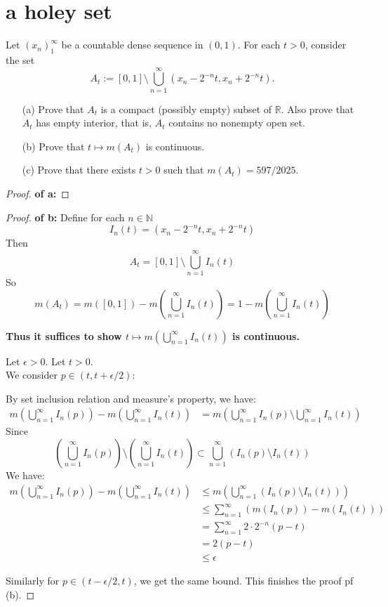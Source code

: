 \documentclass[lang=cn,11pt]{elegantbook}
\begin{document}
\section{a holey set}
  Let $(x_n)_1^\infty$ be a countable dense sequence in $(0,1)$. For each $t>0$, consider the set
  \[
    A_t:=[0,1]\setminus\bigcup_{n=1}^\infty(x_n-2^{-n}t,x_n+2^{-n}t).
  \]
  \begin{itemize}
  \item[(a)]
  Prove that $A_t$ is a compact (possibly empty) subset of $\mathbb{R}$. Also prove that $A_t$ has empty interior, that is, $A_t$ contains no nonempty open set.
\item[(b)]
  Prove that $t\mapsto m(A_t)$ is continuous.
\item[(c)]
  Prove that there exists $t>0$ such that $m(A_t)=597/2025$.
\end{itemize}
\begin{proof}
   \textbf{ of a:}
\end{proof}
\begin{proof}
   \textbf{ of b:}
Define for each $n\in \mathbb{N}$
$$
I_n(t) = (x_n - 2^{-n}t, x_n + 2^{-n}t)
$$
Then $$A_t = [0,1] \setminus \bigcup_{n=1}^\infty I_n(t)$$So
$$
m(A_t) = m([0,1]) - m(\bigcup_{n=1}^\infty I_n(t)) = 1 - m(\bigcup_{n=1}^\infty I_n(t))
$$

\textbf{Thus it suffices to show $t \mapsto m(\bigcup_{n=1}^\infty I_n(t))$ is continuous.}

Let $\epsilon >0$.
Let $t >0$.\\
We consider $p \in (t, t+\epsilon/2)$:

By set inclusion relation and measure's property, we have:
\begin{align}
    m(\bigcup_{n=1}^\infty I_n(p)) -    m(\bigcup_{n=1}^\infty I_n(t)) &=  m(\bigcup_{n=1}^\infty I_n(p) \setminus \bigcup_{n=1}^\infty I_n(t))
\end{align}
Since 
$$
(\bigcup_{n=1}^\infty I_n(p)) \setminus (\bigcup_{n=1}^\infty I_n(t)) \subset \bigcup_{n=1}^\infty (I_n(p) \setminus I_n(t))
$$
We have:
\begin{align}
      m(\bigcup_{n=1}^\infty I_n(p)) -    m(\bigcup_{n=1}^\infty I_n(t))  &\leq m(\bigcup_{n=1}^\infty (I_n(p) \setminus I_n(t)))\\
      & \leq \sum_{n=1}^\infty (m(I_n(p)) - m(I_n(t)))\\
      &= \sum_{n=1}^\infty 2 \cdot 2^{-n}(p-t) \\
      & = 2(p-t) \\
      & \leq \epsilon
\end{align}

Similarly for $p \in (t-\epsilon/2,t)$, we get the same bound. This finishes the proof pf (b).
\end{proof}
\end{document}

